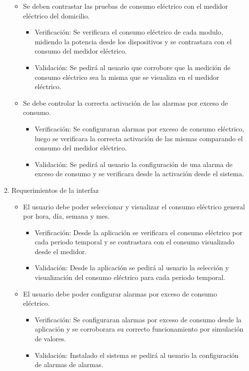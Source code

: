 \documentclass[
11pt, %
]{charter}
\begin{document}
\begin{enumerate}
\begin{itemize}
		\item Se deben contrastar las pruebas de consumo eléctrico con el medidor eléctrico del domicilio.
			\begin{itemize}
			\item Verificación: Se verificara el consumo eléctrico de cada modulo, midiendo la potencia desde los dispositivos y se contrastara con el consumo del medidor eléctrico.
			\item Validación: Se pedirá al usuario que corrobore que la medición de consumo eléctrico sea la misma que se visualiza en el medidor eléctrico.
			\end{itemize}
		\item Se debe controlar la correcta activación de las alarmas por exceso de consumo.
		\begin{itemize}
			\item Verificación: Se configuraran alarmas por exceso de consumo eléctrico, luego se verificara la correcta activación de las mismas comparando el consumo del medidor eléctrico.
			\item Validación: Se pedirá al usuario la configuración de una alarma de exceso de consumo y se verificara desde la activación desde el sistema. 
			\end{itemize}				
		\end{itemize}
	\item Requerimientos de la interfaz
		\begin{itemize}
			\item El usuario debe poder seleccionar y visualizar el consumo eléctrico general por hora, día, semana y mes.
				\begin{itemize}
			\item Verificación: Desde la aplicación se verificara el consumo eléctrico por cada periodo temporal y se contrastara con el consumo visualizado desde el medidor.
			\item Validación: Desde la aplicación se pedirá al usuario la selección y visualización del consumo eléctrico para cada periodo temporal.
			\end{itemize}
			
			\item El usuario debe poder configurar alarmas por exceso de consumo eléctrico.	
			\begin{itemize}
			\item Verificación: Se configuraran alarmas por exceso de consumo desde la aplicación y se corroborara su correcto funcionamiento por simulación de valores.
			\item Validación: Instalado el sistema se pedirá al usuario la configuración de alarmas de alarmas.
			\end{itemize}
		 

\end{itemize}
\end{enumerate}
\end{document}
